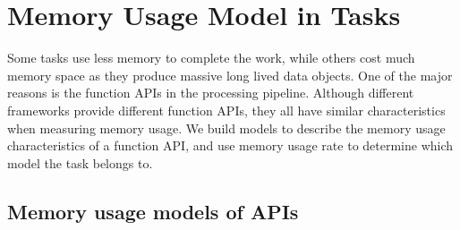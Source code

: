 \section{Memory Usage Model in Tasks}



Some tasks use less memory to complete the work, while others cost much memory space as they produce massive long lived data objects. One of the major reasons is the function APIs in the processing pipeline. Although different frameworks provide different function APIs, they all have similar characteristics when measuring memory usage. We build models to describe the memory usage characteristics of a function API, and use memory usage rate to determine which model the task belongs to.


\subsection{Memory usage models of APIs}

